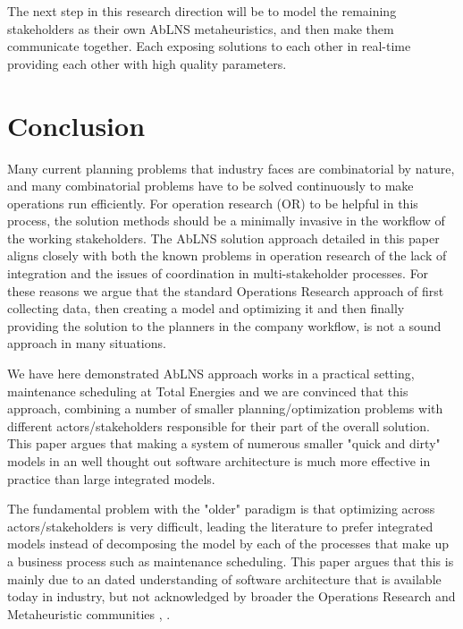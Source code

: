The next step in this research direction will be to model the remaining stakeholders as their own 
AbLNS metaheuristics, and then make them communicate together. Each exposing solutions to each 
other in real-time providing each other with high quality parameters.

\section{Conclusion}
Many current planning problems that industry faces are combinatorial by nature, 
and many combinatorial problems have to be solved continuously to make operations 
run efficiently. For operation research (OR) to be helpful in this process, the solution methods 
should be a minimally invasive in the workflow of the working stakeholders. 
The AbLNS solution approach detailed in this paper aligns
closely with both the known problems in operation research of the lack of integration and the issues of 
coordination in multi-stakeholder processes. For these reasons we argue that the
standard Operations Research approach of  first collecting data, then creating a
model and optimizing it and then finally providing the solution to the planners
in the company workflow, is not a sound approach in many situations.

We have here demonstrated AbLNS approach works in a practical setting,
maintenance scheduling at  Total Energies and we are convinced that this
approach, combining a number of smaller planning/optimization problems with
different actors/stakeholders responsible for their part of the overall
solution. This paper argues that making a system of numerous smaller  "quick
and dirty" models in an well thought out software architecture is much more
effective in practice than large integrated models.

The fundamental problem with the "older" paradigm is that optimizing across
actors/stakeholders is very difficult, leading the literature to prefer
integrated models instead of decomposing the model by each of the
processes that make up a business process such as maintenance scheduling.
This paper argues that this is mainly due to an dated understanding of
software architecture that is available today in industry, but not
acknowledged by broader the Operations Research and Metaheuristic
communities \citep{talbiMetaheuristicsDesignImplementation2009},
\citep{gendreauHandbookMetaheuristics2019}.
